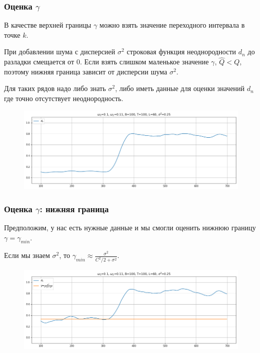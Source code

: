 \documentclass[11pt]{beamer}
\begin{document}
	\begin{frame}
		\frametitle{Оценка $ \gamma $}
		В качестве верхней границы $ \gamma $ можно взять значение переходного интервала в точке $ k $.
		
		При добавлении шума с дисперсией $ \sigma^2 $ строковая функция неоднородности $ d_n $ до разладки смещается от $ 0 $. Если взять слишком маленькое значение $ \gamma $, $ \hat{Q} < Q $, поэтому нижняя граница зависит от дисперсии шума $ \sigma^2 $.
		
		Для таких рядов надо либо знать $ \sigma^2 $, либо иметь данные для оценки значений $ d_n $ где точно отсутствует неоднородность. 
		
		\begin{figure}[b]
			\centering
			\includegraphics[width=\linewidth]{imgs/estimate_gamma_noise}
		\end{figure}
	\end{frame}

	\begin{frame}
		\frametitle{Оценка $ \gamma $: нижняя граница}
		Предположим, у нас есть нужные данные и мы смогли оценить нижнюю границу $ \gamma = \gamma_{min} $.
		
		\bigskip
		Если мы знаем $ \sigma^2 $, то $ \gamma_{min} \approx \frac{\sigma^2}{C^2/2+\sigma^2} $.
		
		\begin{figure}[b]
			\centering
			\includegraphics[width=\linewidth]{imgs/estimate_noise}
		\end{figure}
		
	\end{frame}
\end{document}
